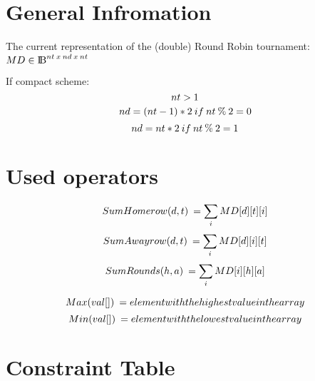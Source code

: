 \documentclass[•]{article}
\begin{document}
\section{General Infromation}
The current representation of the (double) Round Robin tournament: ${MD \in \rm I\!B}^{nt\: x\: nd\: x\: nt}$

If compact scheme:
\[\large nt > 1 \]
\[\large nd = (nt-1) * 2\: if\: nt \:\% \:2 = 0\]
\[\large nd = nt * 2\: if\: nt \:\% \:2 = 1\]

\section{Used operators}
\[\large SumHomerow(d,t)\:= \sum_i MD[d][t][i]\]
\[\large SumAwayrow(d,t)\:= \sum_i MD[d][i][t]\]
\[\large SumRounds(h,a)\:= \sum_i MD[i][h][a]\]

\[\large Max(val[])\:= element with the highest value in the array\]
\[\large Min(val[])\:= element with the lowest value in the array\]


\section{Constraint Table}
\noindent%
\end{document}
